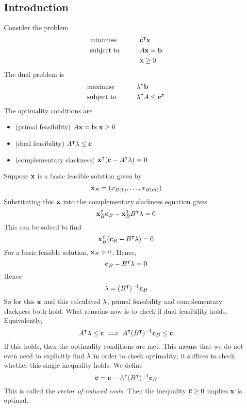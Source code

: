 \subsection{Introduction}
Consider the problem
\begin{alignat*}{2}
	 & \text{minimise}   & \qquad & \vb c^\intercal \vb x \\
	 & \text{subject to} &        & A \vb x = \vb b        \\
	 &                   &        & \vb x \geq 0
\end{alignat*}
The dual problem is
\begin{alignat*}{2}
	 & \text{maximise}   & \qquad & \vb \lambda^\intercal \vb b                   \\
	 & \text{subject to} &        & \vb \lambda^\intercal A \leq \vb c^\intercal \\
\end{alignat*}
The optimality conditions are
\begin{itemize}
	\item (primal feasibility) \( A \vb x = \vb b; \vb x \geq 0 \)
	\item (dual feasibility) \( A^\intercal \vb \lambda \leq \vb c \)
	\item (complementary slackness) \( \vb x^\intercal (\vb c - A^\intercal \vb \lambda) = 0 \)
\end{itemize}
Suppose \( \vb x \) is a basic feasible solution given by
\[
	\vb x_B = (x_{B(1)}, \dots, x_{B(m)})
\]
Substituting this \( \vb x \) into the complementary slackness equation gives
\[
	\vb x_B^\intercal \vb c_B - \vb x_B^\intercal B^\intercal \vb \lambda = 0
\]
This can be solved to find
\[
	\vb x_B^\intercal (\vb c_B - B^\intercal \vb \lambda) = 0
\]
For a basic feasible solution, \( \vb x_B > 0 \).
Hence,
\[
	\vb c_B - B^\intercal \vb \lambda = 0
\]
Hence
\[
	\vb \lambda = (B^\intercal)^{-1} \vb c_B
\]
So for this \( \vb x \) and this calculated \( \vb \lambda \), primal feasibility and complementary slackness both hold.
What remains now is to check if dual feasibility holds.
Equivalently,
\[
	A^\intercal \vb \lambda \leq \vb c \implies A^\intercal (B^\intercal)^{-1} \vb c_B \leq \vb c
\]
If this holds, then the optimality conditions are met.
This means that we do not even need to explicitly find \( \vb \lambda \) in order to check optimality; it suffices to check whether this single inequality holds.
We define
\[
	\overline{\vb c} = \vb c - A^\intercal (B^\intercal)^{-1} \vb c_B
\]
This is called the \textit{vector of reduced costs}.
Then the inequality \( \overline{\vb c} \geq 0 \) implies \( \vb x \) is optimal.

